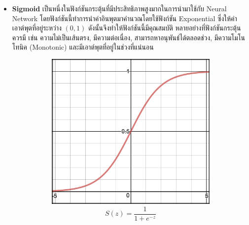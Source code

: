\begin{itemize}
    \item \textbf{Sigmoid}\autocite{wilson1972} เป็นหนึ่งในฟังก์ชันกระตุ้นที่มีประสิทธิภาพสูงมากในการนำมาใช้กับ Neural Network 
    โดยฟังก์ชันนี้ทำการนำค่าอินพุตมาคำนวณโดยใช้ฟังก์ชัน Exponential ซึ่งให้ค่าเอาต์พุตที่อยู่ระหว่าง $(0, 1)$ ดังนั้นจึงทำให้ฟังก์ชันนี้มีคุณสมบัติ%
    หลายอย่างที่ฟังก์ชันกระตุ้นควรมี เช่น ความไม่เป็นเส้นตรง, มีความต่อเนื่อง, สามารถหาอนุพันธ์ได้ตลอดช่วง, มีความโมโนโทนิค (Monotonic)
    และมีเอาต์พุตที่อยู่ในช่วงที่แน่นอน
    \begin{figure}[H]
        \centering
        \begin{subfigure}{0.5\textwidth}
            \centering
            \includegraphics[width=0.9\linewidth]{fig/actfunc_sigmoid.png}
            \caption{%
                \begin{equation}
                    S(z) = \frac{1} {1 + e^{-z}}
                \end{equation}
            }
            \label{fig:actfunc_sigmoid}
        \end{subfigure}%
        \begin{subfigure}{0.5\textwidth}
            \centering

\end{subfigure}
\end{figure}
\end{itemize}
